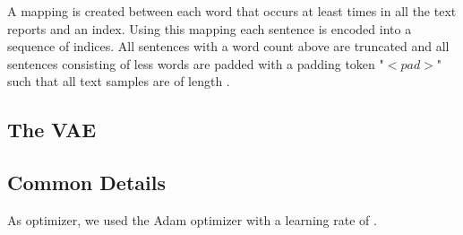 A mapping is created between each word that occurs at least \minwordocc times in all the text reports and an index.
Using this mapping each sentence is encoded into a sequence of indices.
All sentences with a word count above \sentlen are truncated and all sentences consisting of less words are padded with a padding token "$<pad>$" such that all text samples are of length \sentlen.

\subsection{The VAE}

\subsection{Common Details}
As optimizer, we used the Adam optimizer \cite{adam} with a learning rate of \learningrate.